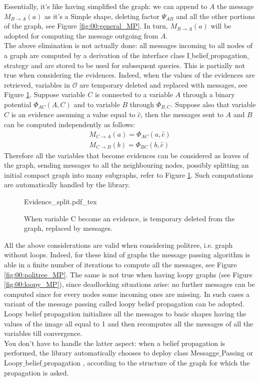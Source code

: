 Essentially, it's like having simplified the graph: we can append to $A$ the message $M _{B \rightarrow A}(a)$ as it's a Simple shape, deleting factor $\Psi _{AB}$ and all the other portions of the graph, see Figure \ref{fig:00:general_MP}.
In turn, $M _{B \rightarrow A}(a)$ will be adopted for computing the message outgoing from $A$.
\\
The above elimination is not actually done: all messages incoming to all nodes of a graph are computed by a derivation of the interface class I$\_$belief$\_$propagation$\_$strategy and are stored to be used for subsequent queries. This is partially not true when considering the evidences. Indeed, when the values of the evidences are retrieved, variables in $\mathcal{O}$ are temporary deleted and replaced with messages, see Figure \ref{fig:00:evidence_split}. Suppose variable $C$ is connected to a variable $A$ through a binary potential $\Phi _{AC}(A,C)$ and to variable $B$ through $\Phi _{B,C}$. Suppose also that variable $C$ is an evidence assuming a value equal to $\hat{c}$, then the messages sent to $A$ and $B$ can be computed independently as follows:
\begin{eqnarray}
M _{C \rightarrow A}(a) = \Phi _{AC}(a, \hat{c}) \nonumber\\
M _{C \rightarrow B}(b) = \Phi _{BC}(b, \hat{c})
\end{eqnarray}
Therefore all the variables that become evidences can be considered as leaves of the graph, sending messages to all the neighbouring nodes, possibly splitting an initial compact graph into many subgraphs,  refer to Figure \ref{fig:00:evidence_split}. Such computations are automatically handled by the library.

\begin{figure}
	\centering
\def\svgwidth{0.65 \textwidth}
{Evidence_split.pdf_tex}
	\caption{When variable C become an evidence, is temporary deleted from the graph, replaced by messages.}
	\label{fig:00:evidence_split}
\end{figure}  

All the above considerations are valid when considering politree, i.e. graph without loops. Indeed, for these kind of graphs the message passing algorithm is able in a finite number of iterations to compute all the messages, see Figure \ref{fig:00:politree_MP}.
The same is not true when having loopy graphs (see Figure \ref{fig:00:loopy_MP}), since deadlocking situations arise: no further messages can be computed since for every nodes some incoming ones are missing.
In such cases a variant of the message passing called loopy belief propagation can be adopted. Loopy belief propagation initializes all the messages to basic shapes having the values of the image all equal to 1 and then recomputes all the messages of all the variables till convergence.
\\
You don't have to handle the latter aspect: when a belief propagation is performed, the library automatically chooses to deploy class 
Messagge$\_$Passing or Loopy$\_$belief$\_$propagation , according to the structure of the graph for which the propagation is asked.

